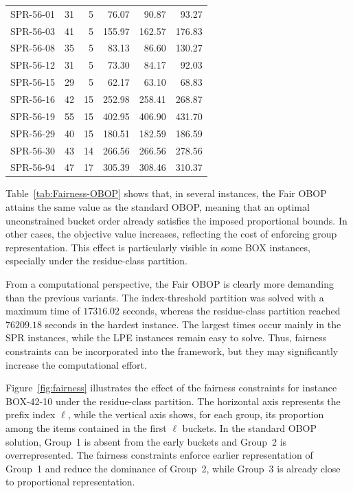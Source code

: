 \documentclass[pdflatex,basic,Numbered]{jnl}%
\theoremstyle{plain}
\theoremstyle{remark}
\theoremstyle{thmstyleone}%
\theoremstyle{thmstylethree}%
\begin{document}
\begin{longtable}{lrr rrr}
SPR-56-01 & 31 & 5 & 76.07 & 90.87 & 93.27 \\
SPR-56-03 & 41 & 5 & 155.97 & 162.57 & 176.83 \\
SPR-56-08 & 35 & 5 & 83.13 & 86.60 & 130.27 \\
SPR-56-12 & 31 & 5 & 73.30 & 84.17 & 92.03 \\
SPR-56-15 & 29 & 5 & 62.17 & 63.10 & 68.83 \\
SPR-56-16 & 42 & 15 & 252.98 & 258.41 & 268.87 \\
SPR-56-19 & 55 & 15 & 402.95 & 406.90 & 431.70 \\
SPR-56-29 & 40 & 15 & 180.51 & 182.59 & 186.59 \\
SPR-56-30 & 43 & 14 & 266.56 & 266.56 & 278.56 \\
SPR-56-94 & 47 & 17 & 305.39 & 308.46 & 310.37 \\

\end{longtable}
\endgroup

Table~\ref{tab:Fairness-OBOP} shows that, in several instances, the Fair {\rm OBOP} attains the same value as the standard {\rm OBOP}, meaning that an optimal unconstrained bucket order already satisfies the imposed proportional bounds. In other cases, the objective value increases, reflecting the cost of enforcing group representation. This effect is particularly visible in some BOX instances, especially under the residue-class partition.

From a computational perspective, the Fair {\rm OBOP} is clearly more demanding than the previous variants. The index-threshold partition was solved with a maximum time of \(17316.02\) seconds, whereas the residue-class partition reached \(76209.18\) seconds in the hardest instance. The largest times occur mainly in the SPR instances, while the LPE instances remain easy to solve. Thus, fairness constraints can be incorporated into the framework, but they may significantly increase the computational effort.

Figure~\ref{fig:fairness} illustrates the effect of the fairness constraints for instance BOX-42-10 under the residue-class partition. The horizontal axis represents the prefix index \(\ell\), while the vertical axis shows, for each group, its proportion among the items contained in the first \(\ell\) buckets. In the standard {\rm OBOP} solution, Group~1 is absent from the early buckets and Group~2 is overrepresented. The fairness constraints enforce earlier representation of Group~1 and reduce the dominance of Group~2, while Group~3 is already close to proportional representation.
\end{document}
